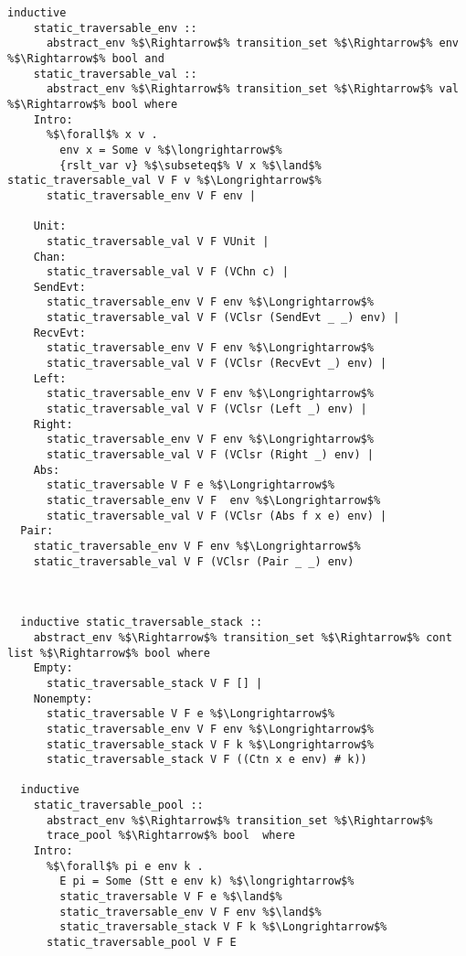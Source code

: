 \documentclass{article}
\begin{document}
\begin{lstlisting}[style=codestyle1, escapechar=\%]
  inductive 
    static_traversable_env ::
      abstract_env %$\Rightarrow$% transition_set %$\Rightarrow$% env %$\Rightarrow$% bool and
    static_traversable_val ::
      abstract_env %$\Rightarrow$% transition_set %$\Rightarrow$% val %$\Rightarrow$% bool where
    Intro:
      %$\forall$% x v .
        env x = Some v %$\longrightarrow$%
        {rslt_var v} %$\subseteq$% V x %$\land$% static_traversable_val V F v %$\Longrightarrow$%
      static_traversable_env V F env |

    Unit:
      static_traversable_val V F VUnit |
    Chan:
      static_traversable_val V F (VChn c) |
    SendEvt:
      static_traversable_env V F env %$\Longrightarrow$%
      static_traversable_val V F (VClsr (SendEvt _ _) env) |
    RecvEvt:
      static_traversable_env V F env %$\Longrightarrow$%
      static_traversable_val V F (VClsr (RecvEvt _) env) |
    Left:
      static_traversable_env V F env %$\Longrightarrow$%
      static_traversable_val V F (VClsr (Left _) env) |
    Right:
      static_traversable_env V F env %$\Longrightarrow$%
      static_traversable_val V F (VClsr (Right _) env) |
    Abs:
      static_traversable V F e %$\Longrightarrow$% 
      static_traversable_env V F  env %$\Longrightarrow$%
      static_traversable_val V F (VClsr (Abs f x e) env) |
  Pair:
    static_traversable_env V F env %$\Longrightarrow$%
    static_traversable_val V F (VClsr (Pair _ _) env) 



  inductive static_traversable_stack ::
    abstract_env %$\Rightarrow$% transition_set %$\Rightarrow$% cont list %$\Rightarrow$% bool where
    Empty:
      static_traversable_stack V F [] |
    Nonempty:
      static_traversable V F e %$\Longrightarrow$%
      static_traversable_env V F env %$\Longrightarrow$%
      static_traversable_stack V F k %$\Longrightarrow$% 
      static_traversable_stack V F ((Ctn x e env) # k))

  inductive
    static_traversable_pool ::
      abstract_env %$\Rightarrow$% transition_set %$\Rightarrow$%
      trace_pool %$\Rightarrow$% bool  where
    Intro:
      %$\forall$% pi e env k .
        E pi = Some (Stt e env k) %$\longrightarrow$% 
        static_traversable V F e %$\land$%
        static_traversable_env V F env %$\land$%
        static_traversable_stack V F k %$\Longrightarrow$% 
      static_traversable_pool V F E

  \end{lstlisting}
\end{document}
